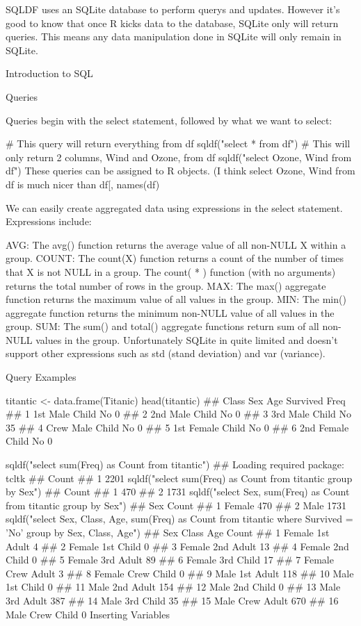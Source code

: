SQLDF uses an SQLite database to perform querys and updates. However it’s good to know that once R kicks data to the database, SQLite only will return queries. This means any data manipulation done in SQLite will only remain in SQLite.

Introduction to SQL

Queries

Queries begin with the select statement, followed by what we want to select:

# This query will return everything from df
sqldf("select         * from df")
# This will only return 2 columns, Wind and Ozone, from df
sqldf("select Ozone, Wind from df")
These queries can be assigned to R objects. (I think select Ozone, Wind from df is much nicer than df[, names(df) %

We can easily create aggregated data using expressions in the select statement. Expressions include:

AVG: The avg() function returns the average value of all non-NULL X within a group.
COUNT: The count(X) function returns a count of the number of times that X is not NULL in a group. The count(       * ) function (with no arguments) returns the total number of rows in the group.
MAX: The max() aggregate function returns the maximum value of all values in the group.
MIN: The min() aggregate function returns the minimum non-NULL value of all values in the group.
SUM: The sum() and total() aggregate functions return sum of all non-NULL values in the group.
Unfortunately SQLite in quite limited and doesn’t support other expressions such as std (stand deviation) and var (variance).

Query Examples

titantic <- data.frame(Titanic)
head(titantic)
##   Class    Sex   Age Survived Freq
## 1   1st   Male Child       No    0
## 2   2nd   Male Child       No    0
## 3   3rd   Male Child       No   35
## 4  Crew   Male Child       No    0
## 5   1st Female Child       No    0
## 6   2nd Female Child       No    0

sqldf("select sum(Freq) as Count from titantic")
## Loading required package: tcltk
##   Count
## 1  2201
sqldf("select sum(Freq) as Count from titantic group by Sex")
##   Count
## 1   470
## 2  1731
sqldf("select Sex, sum(Freq) as Count from titantic group by Sex")
##      Sex Count
## 1 Female   470
## 2   Male  1731
sqldf("select Sex, Class, Age, sum(Freq) as Count from titantic where Survived = 'No' group by Sex, Class, Age")
##       Sex Class   Age Count
## 1  Female   1st Adult     4
## 2  Female   1st Child     0
## 3  Female   2nd Adult    13
## 4  Female   2nd Child     0
## 5  Female   3rd Adult    89
## 6  Female   3rd Child    17
## 7  Female  Crew Adult     3
## 8  Female  Crew Child     0
## 9    Male   1st Adult   118
## 10   Male   1st Child     0
## 11   Male   2nd Adult   154
## 12   Male   2nd Child     0
## 13   Male   3rd Adult   387
## 14   Male   3rd Child    35
## 15   Male  Crew Adult   670
## 16   Male  Crew Child     0
Inserting Variables

